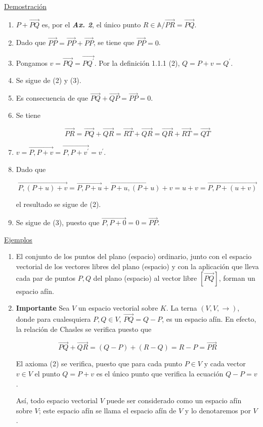 \documentclass[12pt, a4paper, ones, notitlepage, openany,titlepage]{article}
\begin{document}
\noindent\underline{Demostración}
\begin{enumerate}[label=(\arabic*)]
\item $P + \overrightarrow{PQ}$ es, por el \textbf{\textit{Ax. 2}}, el único punto $R \in \mathbb{A} / \overrightarrow{PR} = \overrightarrow{PQ}$.

\item Dado que $\overrightarrow{P P}=\overrightarrow{P P}+\overrightarrow{P P}$, se tiene que $\overrightarrow{P P}=0$.

\item Pongamos $v=\overrightarrow{P Q}=\overrightarrow{P Q^{\prime}}$. Por la definición 1.1.1 (2), $Q=P+v=Q^{\prime}$.

\item Se sigue de (2) y (3).

\item Es consecuencia de que $\overrightarrow{P Q}+\overrightarrow{Q P}=\overrightarrow{P P}=0$.

\item Se tiene

$$
\overrightarrow{P R}=\overrightarrow{P Q}+\overrightarrow{Q R}=\overrightarrow{R T}+\overrightarrow{Q R}=\overrightarrow{Q R}+\overrightarrow{R T}=\overrightarrow{Q T}
$$

\item $v=\overrightarrow{P, P+v}=\overrightarrow{P, P+v^{\prime}}=v^{\prime}$.

\item Dado que

$$
\overrightarrow{P,(P+u)+v}=\overrightarrow{P, P+u}+\overrightarrow{P+u,(P+u)+v}=u+v=\overrightarrow{P, P+(u+v)}
$$

el resultado se sigue de (2).

\item Se sigue de (3), puesto que $\overrightarrow{P, P+0}=0=\overrightarrow{P P}$.
\end{enumerate}

\noindent\underline{Ejemplos}
\begin{enumerate}
\item El conjunto de los puntos del plano (espacio) ordinario, junto con el espacio vectorial de los vectores libres del plano (espacio) y con la aplicación que lleva cada par de puntos $P, Q$ del plano (espacio) al vector libre $[\overrightarrow{P Q}]$, forman un espacio afín.

\item \textbf{Importante} Sea $V$ un espacio vectorial sobre $K$. La terna $(V, V, \rightarrow)$, donde para cualesquiera $P, Q \in V$, $\overrightarrow{P Q}=Q-P$, es un espacio afín. En efecto, la relación de Chasles se verifica puesto que

$$
\overrightarrow{P Q}+\overrightarrow{Q R}=(Q-P)+(R-Q)=R-P=\overrightarrow{P R}
$$

El axioma (2) se verifica, puesto que para cada punto $P \in V$ y cada vector $v \in V$ el punto $Q=P+v$ es el único punto que verifica la ecuación $Q-P=v$.

Así, todo espacio vectorial $V$ puede ser considerado como un espacio afín sobre $V$; este espacio afín se llama el espacio afín de $V$ y lo denotaremos por $V$.
\end{enumerate}
\end{document}
